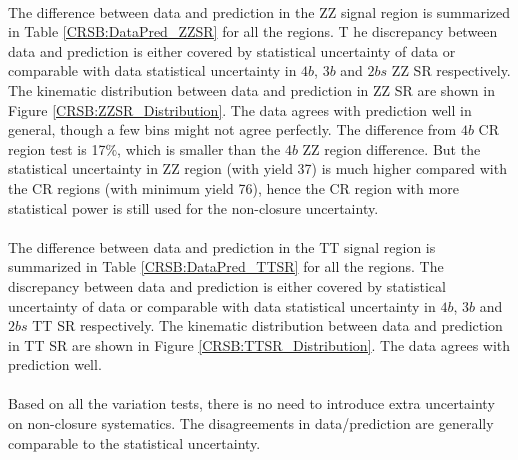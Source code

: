 \paragraph{}
The difference between data and prediction in the ZZ signal region is summarized in Table \ref{CRSB:DataPred_ZZSR} for all the regions. T
he discrepancy between data and prediction is either covered by statistical uncertainty of data or comparable with data statistical uncertainty in $4b$, $3b$ and $2bs$ ZZ SR respectively. 
The kinematic distribution between data and prediction in ZZ SR are shown in Figure \ref{CRSB:ZZSR_Distribution}. 
The data agrees with prediction well in general, though a few bins might not agree perfectly. 
The difference from $4b$ CR region test is 17$\%$, which is smaller than the $4b$ ZZ region difference. 
But the statistical uncertainty in ZZ region (with yield 37) is much higher compared with the CR regions (with minimum yield 76), hence the CR region with more statistical power is still used for the non-closure uncertainty.

\paragraph{}
The difference between data and prediction in the TT signal region is summarized in Table \ref{CRSB:DataPred_TTSR} for all the regions. 
The discrepancy between data and prediction is either covered by statistical uncertainty of data or comparable with data statistical uncertainty in $4b$, $3b$ and $2bs$ TT SR respectively. 
The kinematic distribution between data and prediction in TT SR are shown in Figure \ref{CRSB:TTSR_Distribution}. 
The data agrees with prediction well. 

\paragraph{}
Based on all the variation tests, there is no need to introduce extra uncertainty on non-closure systematics. 
The disagreements in data/prediction are generally comparable to the statistical uncertainty.

% 

